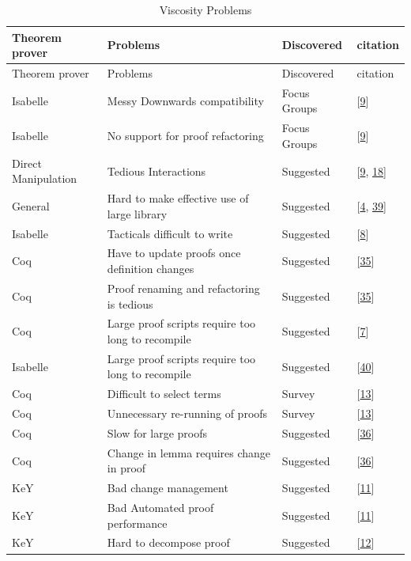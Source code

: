 \documentclass[
]{article}
\begin{document}
\begin{longtable}[]{@{}llll@{}}
\caption{\label{tbl:viscosity}Viscosity Problems}\tabularnewline
\toprule
Theorem prover & Problems & Discovered & citation \\
\midrule
\endfirsthead
\toprule
Theorem prover & Problems & Discovered & citation \\
\midrule
\endhead
Isabelle & Messy Downwards compatibility & Focus Groups &
{[}\protect\hyperlink{ref-beckert_usability_2015}{9}{]} \\
Isabelle & No support for proof refactoring & Focus Groups &
{[}\protect\hyperlink{ref-beckert_usability_2015}{9}{]} \\
Direct Manipulation & Tedious Interactions & Suggested &
{[}\protect\hyperlink{ref-beckert_usability_2015}{9},
\protect\hyperlink{ref-grebing_usability_2020}{18}{]} \\
General & Hard to make effective use of large library & Suggested &
{[}\protect\hyperlink{ref-asperti_considerations_2010}{4},
\protect\hyperlink{ref-tassi_interactive_2008}{39}{]} \\
Isabelle & Tacticals difficult to write & Suggested &
{[}\protect\hyperlink{ref-becker_lassie_2021}{8}{]} \\
Coq & Have to update proofs once definition changes & Suggested &
{[}\protect\hyperlink{ref-ringer_replica_2020}{35}{]} \\
Coq & Proof renaming and refactoring is tedious & Suggested &
{[}\protect\hyperlink{ref-ringer_replica_2020}{35}{]} \\
Coq & Large proof scripts require too long to recompile & Suggested &
{[}\protect\hyperlink{ref-barras_asynchronous_2015}{7}{]} \\
Isabelle & Large proof scripts require too long to recompile & Suggested
& {[}\protect\hyperlink{ref-wenzel_asynchronous_2014}{40}{]} \\
Coq & Difficult to select terms & Survey &
{[}\protect\hyperlink{ref-berman_development_2014}{13}{]} \\
Coq & Unnecessary re-running of proofs & Survey &
{[}\protect\hyperlink{ref-berman_development_2014}{13}{]} \\
Coq & Slow for large proofs & Suggested &
{[}\protect\hyperlink{ref-roe_coqpie_2016}{36}{]} \\
Coq & Change in lemma requires change in proof & Suggested &
{[}\protect\hyperlink{ref-roe_coqpie_2016}{36}{]} \\
KeY & Bad change management & Suggested &
{[}\protect\hyperlink{ref-beckert_evaluating_2012}{11}{]} \\
KeY & Bad Automated proof performance & Suggested &
{[}\protect\hyperlink{ref-beckert_evaluating_2012}{11}{]} \\
KeY & Hard to decompose proof & Suggested &
{[}\protect\hyperlink{ref-beckert_interactive_2015}{12}{]} \\
\bottomrule
\end{longtable}
\end{document}
